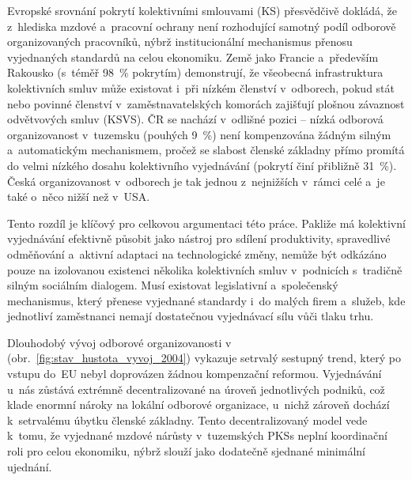 Evropské srovnání pokrytí kolektivními smlouvami (\acs{KS}) přesvědčivě dokládá, že z~hlediska mzdové a~pracovní ochrany není rozhodující samotný podíl odborově organizovaných pracovníků, nýbrž institucionální mechanismus přenosu vyjednaných standardů na celou ekonomiku. Země jako Francie a~především Rakousko (s~téměř \SI{98}{\percent} pokrytím) demonstrují, že všeobecná infrastruktura kolektivních smluv může existovat i~při nízkém členství v~odborech, pokud stát nebo povinné členství v~zaměstnavatelských komorách zajišťují plošnou závaznost odvětvových smluv (\acs{KSVS}). \ac{ČR} se nachází v~odlišné pozici -- nízká odborová organizovanost v~tuzemsku (pouhých \SI{9}{\percent}) není kompenzována žádným silným a~automatickým mechanismem, pročež se slabost členské základny přímo promítá do velmi nízkého dosahu kolektivního vyjednávání (pokrytí činí přibližně \SI{31}{\percent}). Česká organizovanost v~odborech je tak jednou z~nejnižších v~rámci celé  a~je také o~něco nižší než v~USA.\par



Tento rozdíl je klíčový pro celkovou argumentaci této práce. Pakliže má kolektivní vyjednávání efektivně působit jako nástroj pro sdílení produktivity, spravedlivé odměňování a~aktivní adaptaci na technologické změny, nemůže být odkázáno pouze na izolovanou existenci několika kolektivních smluv v~podnicích s~tradičně silným sociálním dialogem. Musí existovat legislativní a~společenský mechanismus, který přenese vyjednané standardy i~do malých firem a~služeb, kde jednotliví zaměstnanci nemají dostatečnou vyjednávací sílu vůči tlaku trhu.\par

%


Dlouhodobý vývoj odborové organizovanosti v~ (obr.~\ref{fig:stav_hustota_vyvoj_2004}) vykazuje setrvalý sestupný trend, který po vstupu do~\acs{EU} nebyl doprovázen žádnou kompenzační reformou. Vyjednávání u~nás zůstává extrémně decentralizované na úroveň jednotlivých podniků, což klade enormní nároky na lokální odborové organizace, u~nichž zároveň dochází k~setrvalému úbytku členské základny. Tento decentralizovaný model vede k~tomu, že vyjednané mzdové nárůsty v~tuzemských \acp{PKS} neplní koordinační roli pro celou ekonomiku, nýbrž slouží jako dodatečně sjednané minimální ujednání.\par

